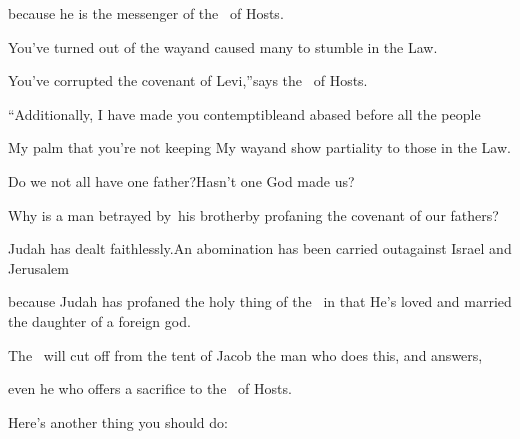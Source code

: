 \begin{inparaenum}
  \pc because he is the messenger of the \lord\ of Hosts.%
  
  \pb {} You've turned out of the way\pa and caused many to stumble in the Law.%
  
  \pc You've corrupted the covenant of Levi,''\pa says the \lord\ of Hosts.%
  
  \pb {} ``Additionally, I have made you contemptible\pa and abased before all the people%
  
  \pc My palm that you're not keeping My way\pa and show partiality%
  to those%
  in the Law.%
  
  \pa {} Do we not all have one father?\pa Hasn't one God made us?%
  
  \pb Why is a man betrayed by\footnotemark\ his brother\pa by profaning the covenant of our fathers?%
  
  \pa {} Judah has dealt faithlessly.\pa An abomination has been carried out\pa against Israel and Jerusalem%
  
  \pc %
  because Judah has profaned the holy thing of the \lord\ in that He's loved and married the daughter of a foreign god.%
  
  \pb {} The \lord\ will cut off from the tent of Jacob the man who does this, %
  and answers,%
  
  \pc even he who offers a sacrifice to the \lord\ of Hosts.%
  
  \pa {} Here's another thing you should do:%
  

\end{inparaenum}
